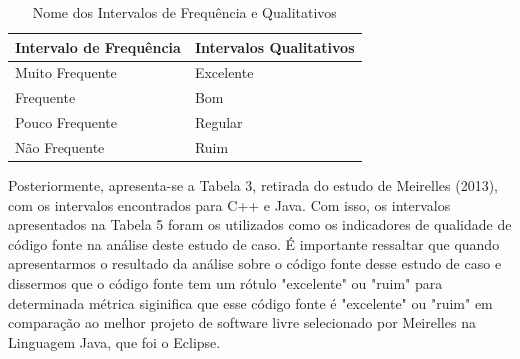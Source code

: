 \begin{table}[!ht]
	\begin{center}
	 \begin{tabular}{|l|l|}
		\hline
		Intervalo de Frequência & Intervalos Qualitativos \\ \hline
		Muito Frequente & Excelente \\ \hline
		Frequente       & Bom       \\ \hline
		Pouco Frequente & Regular   \\ \hline
		Não Frequente   & Ruim      \\ \hline
		\end{tabular}
		\caption{Nome dos Intervalos de Frequência e Qualitativos}
		\label{nomes}
		\end{center}
		\end{table}


Posteriormente, apresenta-se a Tabela 3, retirada do
estudo de Meirelles (2013), com os intervalos encontrados para C++ e Java. Com isso, os intervalos apresentados na Tabela 5 foram os utilizados como os indicadores
de qualidade de código fonte na análise deste estudo de caso. É importante ressaltar que quando apresentarmos o resultado da análise sobre o código fonte desse estudo de caso e dissermos que o código fonte tem um rótulo "excelente" ou "ruim" para determinada métrica siginifica que esse código fonte é "excelente" ou "ruim" em comparação ao melhor projeto de software livre selecionado por Meirelles na Linguagem Java, que foi o Eclipse.

